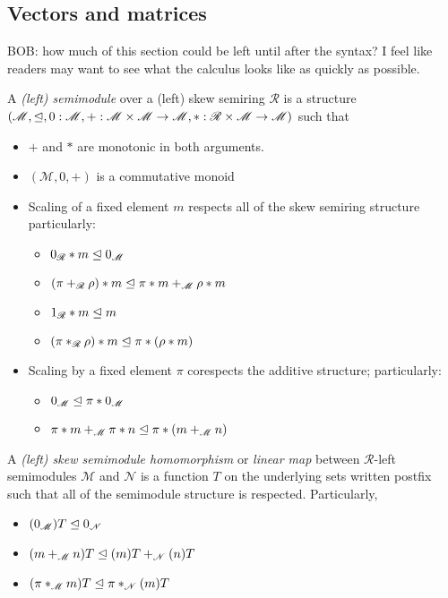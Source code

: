 \documentclass[submission,copyright,creativecommons]{eptcs}
\begin{document}
\subsection{Vectors and matrices}

BOB: how much of this section could be left until after the syntax? I
feel like readers may want to see what the calculus looks like as
quickly as possible.

\begin{definition}
  A \emph{(left) semimodule} over a (left) skew semiring $\mathscr R$ is a
  structure
  $(\mathscr M, \trianglelefteq,
  0 : \mathscr M, + : \mathscr M \times \mathscr M \to \mathscr M,
  * : \mathscr R \times \mathscr M \to \mathscr M)$ such that
  \begin{itemize}
    \item $+$ and $*$ are monotonic in both arguments.
    \item $(\mathscr M, 0, +)$ is a commutative monoid
    \item Scaling of a fixed element $m$ respects all of the skew semiring
      structure particularly:
      \begin{itemize}
        \item $0_\mathscr R * m \trianglelefteq 0_\mathscr M$
        \item $(\pi +_\mathscr R \rho) * m \trianglelefteq \pi * m +_\mathscr M \rho * m$
        \item $1_\mathscr R * m \trianglelefteq m$
        \item $(\pi *_\mathscr R \rho) * m \trianglelefteq \pi * (\rho * m)$
      \end{itemize}
    \item Scaling by a fixed element $\pi$ corespects the additive structure;
      particularly:
      \begin{itemize}
        \item $0_\mathscr M \trianglelefteq \pi * 0_\mathscr M$
        \item $\pi * m +_\mathscr M \pi * n \trianglelefteq \pi * (m +_\mathscr M n)$
      \end{itemize}
  \end{itemize}
\end{definition}

\begin{definition}
  A \emph{(left) skew semimodule homomorphism} or \emph{linear map} between
  $\mathscr R$-left semimodules $\mathscr M$ and $\mathscr N$ is a function $T$
  on the underlying sets written postfix such that all of the semimodule
  structure is respected.
  Particularly,
  \begin{itemize}
  \item $(0_\mathscr M)T \trianglelefteq 0_\mathscr N$
  \item $(m +_\mathscr M n)T \trianglelefteq (m)T +_\mathscr N (n)T$
  \item $(\pi *_\mathscr M m)T \trianglelefteq \pi *_\mathscr N (m)T$
  \end{itemize}
\end{definition}
\end{document}
